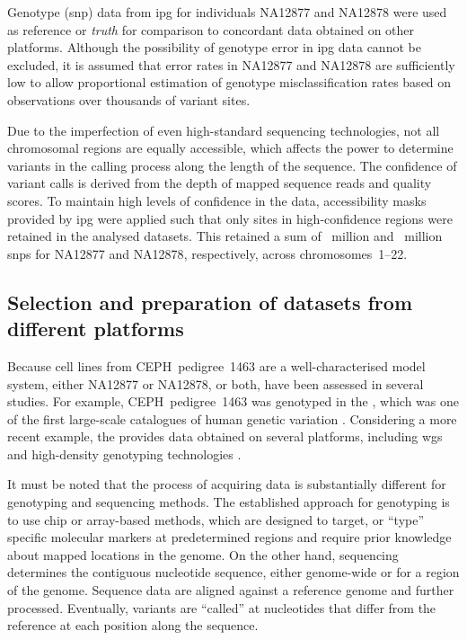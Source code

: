 %

%

Genotype (\gls{snp}) data from \gls{ipg} for individuals \textsf{NA12877} and \textsf{NA12878} were used as reference or \emph{truth} for comparison to concordant data obtained on other platforms.
Although the possibility of genotype error in \gls{ipg} data cannot be excluded, it is assumed that error rates in \textsf{NA12877} and \textsf{NA12878} are sufficiently low to allow proportional estimation of genotype misclassification rates based on observations over thousands of variant sites.

Due to the imperfection of even high-standard sequencing technologies, not all chromosomal regions are equally accessible, which affects the power to determine variants in the calling process along the length of the sequence.
The confidence of variant calls is derived from the depth of mapped sequence reads and quality scores.
To maintain high levels of confidence in the data, accessibility masks provided by \gls{ipg} were applied such that only sites in high-confidence regions were retained in the analysed datasets.
This retained a sum of ~million and ~million \glspl{snp} for \textsf{NA12877} and \textsf{NA12878}, respectively, across chromosomes~1--22.


%
\subsection{Selection and preparation of datasets from different platforms}\label{sec:err_test_data}
%

Because cell lines from CEPH~pedigree~1463 are a well-characterised model system, either \textsf{NA12877} or \textsf{NA12878}, or both, have been assessed in several studies.
For example, CEPH~pedigree~1463 was genotyped in the , which was one of the first large-scale catalogues of human genetic variation \citep{Thorisson:2005ff,Frazer:2007kha,InternationalHapMapConsortium:2010en}.
Considering a more recent example, the  provides data obtained on several platforms, including \gls{wgs} and high-density genotyping technologies \citep{Durbin:2010gj,GenomesProjectConsortium:2012co,Auton:2015gk}.

It must be noted that the process of acquiring data is substantially different for genotyping and sequencing methods.
The established approach for genotyping is to use chip or array-based methods, which are designed to target, or ``type'' specific molecular markers at predetermined regions and require prior knowledge about mapped locations in the genome.
On the other hand, sequencing determines the contiguous nucleotide sequence, either genome-wide or for a region of the genome.
Sequence data are aligned against a reference genome and further processed.
Eventually, variants are ``called'' at nucleotides that differ from the reference at each position along the sequence.

